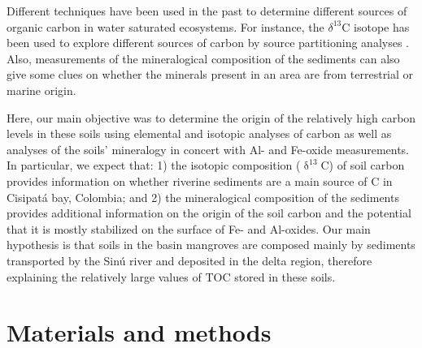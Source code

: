 Different techniques have been used in the past to determine different sources of organic carbon in water saturated ecosystems. For instance, the $\delta^{13}$C isotope has been used to explore different sources of carbon by source partitioning analyses \citep{Bouillion, Spohn2012, Spohn2013}. Also, measurements of the mineralogical composition of the sediments can also give some clues on whether the minerals present in an area are from terrestrial or marine origin. 

Here, our main objective was to determine the origin of the relatively high carbon levels in these soils using elemental and isotopic analyses of carbon as well as analyses of the soils' mineralogy in concert with Al- and Fe-oxide measurements. In particular, we expect that: 1) the isotopic composition ($\updelta ^{13}$C) of soil carbon provides information on whether riverine sediments are a main source of C in Cisipat\'a bay, Colombia; and  2) the mineralogical composition of the sediments provides additional information on the origin of the soil carbon and the potential that it is mostly stabilized on the surface of Fe- and Al-oxides. Our main hypothesis is that soils in the basin mangroves are composed mainly by sediments transported by the Sin\'u river and deposited in the delta region, therefore explaining the relatively large values of TOC stored in these soils. 



\section{Materials and methods} \label{sec:1}
